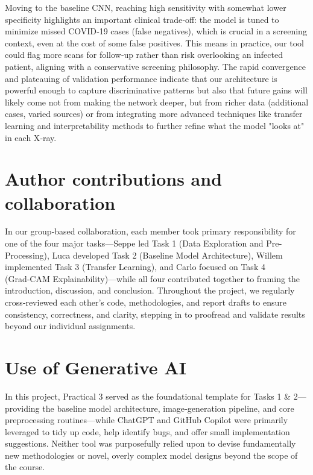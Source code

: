 \documentclass[conference]{IEEEtran}
\begin{document}
Moving to the baseline CNN, reaching high sensitivity with somewhat lower specificity highlights an important clinical trade‑off: the model is tuned to minimize missed COVID‑19 cases (false negatives), which is crucial in a screening context, even at the cost of some false positives. This means in practice, our tool could flag more scans for follow‑up rather than risk overlooking an infected patient, aligning with a conservative screening philosophy. The rapid convergence and plateauing of validation performance indicate that our architecture is powerful enough to capture discriminative patterns but also that future gains will likely come not from making the network deeper, but from richer data (additional cases, varied sources) or from integrating more advanced techniques like transfer learning and interpretability methods to further refine what the model "looks at" in each X‑ray.

\section{Author contributions and collaboration}

In our group‐based collaboration, each member took primary responsibility for one of the four major tasks—Seppe led Task 1 (Data Exploration and Pre‐Processing), Luca developed Task 2 (Baseline Model Architecture), Willem implemented Task 3 (Transfer Learning), and Carlo focused on Task 4 (Grad‑CAM Explainability)—while all four contributed together to framing the introduction, discussion, and conclusion. Throughout the project, we regularly cross‐reviewed each other’s code, methodologies, and report drafts to ensure consistency, correctness, and clarity, stepping in to proofread and validate results beyond our individual assignments.

\section{Use of Generative AI}

In this project, Practical 3 served as the foundational template for Tasks 1 \& 2—providing the baseline model architecture, image‐generation pipeline, and core preprocessing routines—while ChatGPT and GitHub Copilot were primarily leveraged to tidy up code, help identify bugs, and offer small implementation suggestions. Neither tool was purposefully relied upon to devise fundamentally new methodologies or novel, overly complex model designs beyond the scope of the course. 
\end{document}
